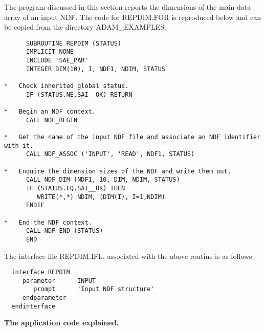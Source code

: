 The program discussed in this section reports the
dimensions of the main data array of an input NDF.
The code for REPDIM.FOR is reproduced below and can be copied from the
directory ADAM\_EXAMPLES.
\begin{verbatim}
      SUBROUTINE REPDIM (STATUS)
      IMPLICIT NONE
      INCLUDE 'SAE_PAR'                                       
      INTEGER DIM(10), I, NDF1, NDIM, STATUS

*   Check inherited global status.
      IF (STATUS.NE.SAI__OK) RETURN

*   Begin an NDF context.    
      CALL NDF_BEGIN                                          
                                                              
*   Get the name of the input NDF file and associate an NDF identifier with it.
      CALL NDF_ASSOC ('INPUT', 'READ', NDF1, STATUS)
                                                              
*   Enquire the dimension sizes of the NDF and write them out.
      CALL NDF_DIM (NDF1, 10, DIM, NDIM, STATUS)
      IF (STATUS.EQ.SAI__OK) THEN
         WRITE(*,*) NDIM, (DIM(I), I=1,NDIM)
      ENDIF

*   End the NDF context.                                       
      CALL NDF_END (STATUS)                                  
      END                 
\end{verbatim}

The interface file REPDIM.IFL, associated with the above routine is
as follows:
\begin{verbatim}
  interface REPDIM
     parameter      INPUT
        prompt      'Input NDF structure'
     endparameter
  endinterface
\end{verbatim}


{\large\bf The application code explained.}

